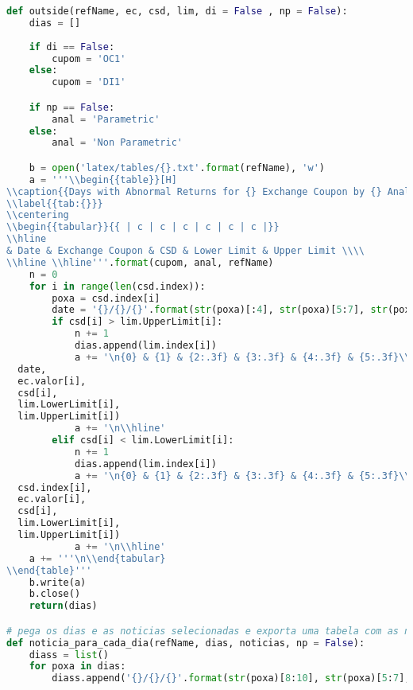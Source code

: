 \begin{lstlisting}[language=Python]
def outside(refName, ec, csd, lim, di = False , np = False):
    dias = []
    
    if di == False:
        cupom = 'OC1'
    else:
        cupom = 'DI1'

    if np == False:
        anal = 'Parametric'
    else:
        anal = 'Non Parametric'

    b = open('latex/tables/{}.txt'.format(refName), 'w')
    a = '''\\begin{{table}}[H]
\\caption{{Days with Abnormal Returns for {} Exchange Coupon by {} Analysis}}
\\label{{tab:{}}}
\\centering
\\begin{{tabular}}{{ | c | c | c | c | c | c |}}
\\hline
& Date & Exchange Coupon & CSD & Lower Limit & Upper Limit \\\\
\\hline \\hline'''.format(cupom, anal, refName)
    n = 0
    for i in range(len(csd.index)):
        poxa = csd.index[i]
        date = '{}/{}/{}'.format(str(poxa)[:4], str(poxa)[5:7], str(poxa)[8:10])
        if csd[i] > lim.UpperLimit[i]:
            n += 1
            dias.append(lim.index[i])
            a += '\n{0} & {1} & {2:.3f} & {3:.3f} & {4:.3f} & {5:.3f}\\\\'.format(n,
  date,
  ec.valor[i],
  csd[i],
  lim.LowerLimit[i],
  lim.UpperLimit[i])
            a += '\n\\hline'
        elif csd[i] < lim.LowerLimit[i]:
            n += 1
            dias.append(lim.index[i])
            a += '\n{0} & {1} & {2:.3f} & {3:.3f} & {4:.3f} & {5:.3f}\\\\'.format(n,
  csd.index[i],
  ec.valor[i],
  csd[i],
  lim.LowerLimit[i],
  lim.UpperLimit[i])
            a += '\n\\hline'
    a += '''\n\\end{tabular}
\\end{table}'''
    b.write(a)
    b.close()
    return(dias)

# pega os dias e as noticias selecionadas e exporta uma tabela com as noticias para cada dia de volatilidade anormal
def noticia_para_cada_dia(refName, dias, noticias, np = False):
    diass = list()
    for poxa in dias:
        diass.append('{}/{}/{}'.format(str(poxa)[8:10], str(poxa)[5:7], str(poxa)[:4]))


\end{lstlisting}
